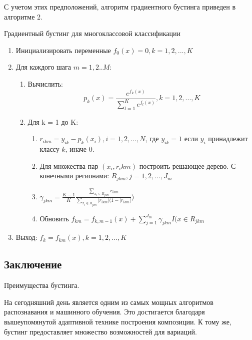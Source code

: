 С учетом этих предположений, алгоритм градиентного бустинга приведен в алгоритме 2.


\begin{algorithm}
  \caption{Градиентный бустинг для многоклассовой классификации}
  \label{gradient-boosting-algorithm}
  \begin{enumerate}
  \item Инициализировать переменные $f_0(x)=0, k=1,2,...,K$
  \item Для каждого шага $m=1,2 .. M$:
    \begin{enumerate}
      \item Вычислить:
      \begin{equation}
      	p_k(x)=\frac{e^{f_k(x)}}{\sum_{l=1}^{K}e^{f_l(x)}}, k=1,2,...,K
      \end{equation}
      \item Для k = 1 до K:
      \begin{enumerate}
      	\item $r_{ikm}=y_{ik}-p_k(x_i), i=1,2,...,N$, где $y_{ik}=1$ если $y_i$ принадлежит классу $k$, иначе 0.
      	\item Для множества пар $(x_i,r_ikm)$ построить решающее дерево. С конечными регионами: $R_{jkm}, j=1,2,...,J_m$
      	\item $\gamma_{jkm}=\frac{K-1}{K}\frac{\sum_{x_i\in R_{jkm}}r_{ikm}}{\sum_{x_i\in R_{jkm}}|r_{ikm}|(1-|r_{ikm}|})$
      	\item Обновить $f_{km}=f_{k,m-1}(x)+\sum_{j=1}^{J_m}\gamma_{jkm}I(x\in R_{jkm}$
      \end{enumerate}
    \end{enumerate}
    \item Выход: $f_k=f_{km}(x), k=1,2,...,K$
  \end{enumerate}
\end{algorithm}

\subsection{Заключение}


Преимущества бустинга.


На сегодняшний день является одним из самых мощных алгоритмов распознавания и машинного обучения. Это достигается благодаря вышеупомянутой адаптивной технике построения композиции. К тому же, бустинг предоставляет множество возможностей для вариаций. 


